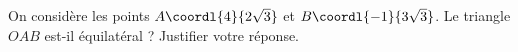 \begin{exo}
	On considère les points $A\coordl{4}{2\sqrt{3}}$ et $B\coordl{-1}{3\sqrt{3}}$. Le triangle $OAB$ est-il équilatéral ? Justifier votre réponse.
\end{exo}
